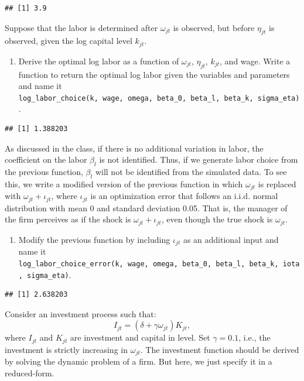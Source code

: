 \documentclass[
]{book}
\providecommand{\tightlist}{%
  \setlength{\itemsep}{0pt}\setlength{\parskip}{0pt}}
\begin{document}
\begin{verbatim}
## [1] 3.9
\end{verbatim}

Suppose that the labor is determined after \(\omega_{jt}\) is observed, but before \(\eta_{jt}\) is observed, given the log capital level \(k_{jt}\).

\begin{enumerate}
\def\labelenumi{\arabic{enumi}.}
\setcounter{enumi}{2}
\tightlist
\item
  Derive the optimal log labor as a function of \(\omega_{jt}\), \(\eta_{jt}\), \(k_{jt}\), and wage. Write a function to return the optimal log labor given the variables and parameters and name it \texttt{log\_labor\_choice(k,\ wage,\ omega,\ beta\_0,\ beta\_l,\ beta\_k,\ sigma\_eta)}.
\end{enumerate}

\begin{verbatim}
## [1] 1.388203
\end{verbatim}

As discussed in the class, if there is no additional variation in labor, the coefficient on the labor \(\beta_l\) is not identified. Thus, if we generate labor choice from the previous function, \(\beta_l\) will not be identified from the simulated data. To see this, we write a modified version of the previous function in which \(\omega_{jt}\) is replaced with \(\omega_{jt} + \iota_{jt}\), where \(\iota_{jt}\) is an optimization error that follows an i.i.d. normal distribution with mean 0 and standard deviation 0.05. That is, the manager of the firm perceives as if the shock is \(\omega_{jt} + \iota_{jt}\), even though the true shock is \(\omega_{jt}\).

\begin{enumerate}
\def\labelenumi{\arabic{enumi}.}
\setcounter{enumi}{3}
\tightlist
\item
  Modify the previous function by including \(\iota_{jt}\) as an additional input and name it \texttt{log\_labor\_choice\_error(k,\ wage,\ omega,\ beta\_0,\ beta\_l,\ beta\_k,\ iota,\ sigma\_eta)}.
\end{enumerate}

\begin{verbatim}
## [1] 2.638203
\end{verbatim}

Consider an investment process such that:
\[
I_{jt} = (\delta + \gamma \omega_{jt}) K_{jt},
\]
where \(I_{jt}\) and \(K_{jt}\) are investment and capital in level. Set \(\gamma = 0.1\), i.e., the investment is strictly increasing in \(\omega_{jt}\). The investment function should be derived by solving the dynamic problem of a firm. But here, we just specify it in a reduced-form.
\end{document}

